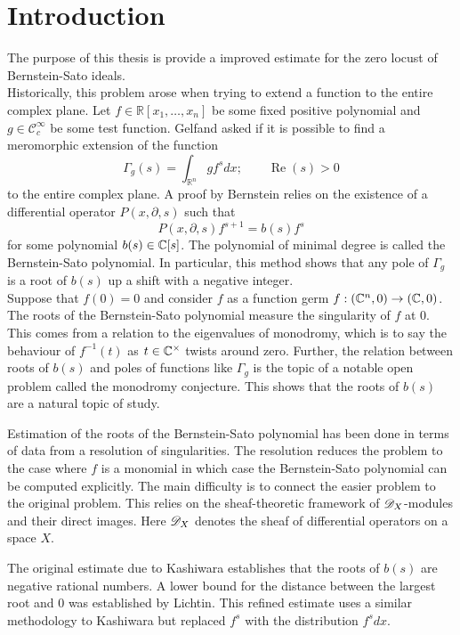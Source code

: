 \chapter*{Introduction} %




The purpose of this thesis is provide a improved estimate for the zero locust of Bernstein-Sato ideals.\\

Historically, this problem arose when trying to extend a function to the entire complex plane.
Let $f\in \mathbb{R}[x_1,\ldots,x_n]$ be some fixed positive polynomial and $g \in \mathcal{C}_c^\infty$ be some test function.
Gelfand asked if it is possible to find a meromorphic extension of the function
$$\Gamma_g(s) = \int_{\mathbb{R}^n} g f^s dx; \qquad \operatorname{Re}(s)>0 $$
to the entire complex plane.
A proof by Bernstein relies on the existence of a differential operator $P(x,\partial, s)$ such that
$$P(x,\partial,s) f^{s+1} = b(s) f^s$$
for some polynomial $b(s)\in \mathbb{C}[s]$.
The polynomial of minimal degree is called the Bernstein-Sato polynomial.
In particular, this method shows that any pole of $\Gamma_g$ is a root of $b(s)$ up a shift with a negative integer.\\

Suppose that $f(0)= 0$ and consider $f$ as a function germ $f:(\mathbb{C}^n,0)\to (\mathbb{C},0)$.
The roots of the Bernstein-Sato polynomial measure the singularity of $f$ at $0$.
This comes from a relation to the eigenvalues of monodromy, which is to say the behaviour of $f^{-1}(t)$ as $t\in \mathbb{C}^\times$ twists around zero.
Further, the relation between roots of $b(s)$ and poles of functions like $\Gamma_g$ is the topic of a notable open problem called the monodromy conjecture.
This shows that the roots of $b(s)$ are a natural topic of study.

Estimation of the roots of the Bernstein-Sato polynomial has been done in terms of data from a resolution of singularities.
The resolution reduces the problem to the case where $f$ is a monomial in which case the Bernstein-Sato polynomial can be computed explicitly.
The main difficulty is to connect the easier problem to the original problem.
This relies on the sheaf-theoretic framework of $\mathscr{D}_X$-modules and their direct images.
Here $\mathscr{D}_X$ denotes the sheaf of differential operators on a space $X$.

The original estimate due to Kashiwara establishes that the roots of $b(s)$ are negative rational numbers.
A lower bound for the distance between the largest root and $0$ was established by Lichtin.
This refined estimate uses a similar methodology to Kashiwara but replaced $f^s$ with the distribution $f^s dx$.
\\

